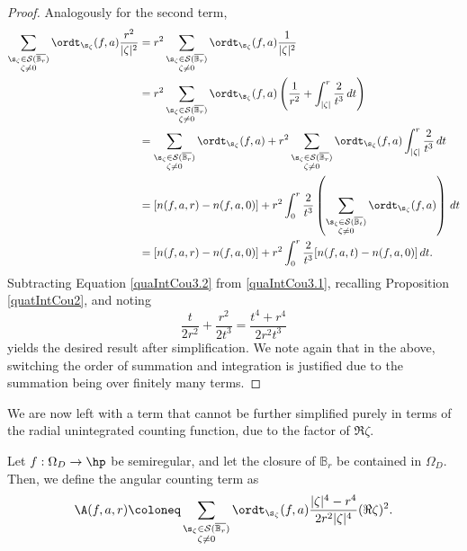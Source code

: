 \documentclass{amsart}
\begin{document}
\begin{proof}
    Analogously for the second term, \begin{align}\label{quaIntCou3.2}
        \sum_{\substack{ \s_\zeta\in\mathcal{S}(\overline{\mathbb B_r}) \\ \zeta\neq 0}}\ordt_{\s_\zeta}(f,a)\frac{r^2}{|\zeta|^2} 
        &= r^2 \sum_{\substack{ \s_\zeta\in\mathcal{S}(\overline{\mathbb B_r}) \\ \zeta\neq 0}}\ordt_{\s_\zeta}(f,a) \frac{1}{|\zeta|^2} \nonumber\\
        &= r^2 \sum_{\substack{ \s_\zeta\in\mathcal{S}(\overline{\mathbb B_r}) \\ \zeta\neq 0}}\ordt_{\s_\zeta}(f,a)\left(\frac{1}{r^2}+\int_{|\zeta|}^r\frac{2}{t^3}\,dt \right) \nonumber\\
        &= \sum_{\substack{ \s_\zeta\in\mathcal{S}(\overline{\mathbb B_r}) \\ \zeta\neq 0}}\ordt_{\s_\zeta}(f,a)+ r^2\sum_{\substack{ \s_\zeta\in\mathcal{S}(\overline{\mathbb B_r}) \\ \zeta\neq 0}}\ordt_{\s_\zeta}(f,a)\int_{|\zeta|}^r\frac{2}{t^3}\,dt \nonumber\\
        &= [n(f,a,r)-n(f,a,0)]+r^2\int_0^r \frac{2}{t^3}\left(\sum_{\substack{ \s_\zeta\in\mathcal{S}(\overline{\mathbb B_t}) \\ \zeta\neq 0}}\ordt_{\s_\zeta}(f,a)\right) \,dt \nonumber\\
        &= [n(f,a,r)-n(f,a,0)]+r^2\int_0^r \frac{2}{t^3}[n(f,a,t)-n(f,a,0)] \,dt.
    \end{align}
    Subtracting Equation \ref{quaIntCou3.2} from \ref{quaIntCou3.1}, recalling Proposition \ref{quatIntCou2}, and noting \[\frac{t}{2r^2}+\frac{r^2}{2t^3}=\frac{t^4+r^4}{2r^2t^3}\] yields the desired result after simplification. We note again that in the above, switching the order of summation and integration is justified due to the summation being over finitely many terms. 
\end{proof}

We are now left with a term that cannot be further simplified purely in terms of the radial unintegrated counting function, due to the factor of $\Re\zeta $. 
\begin{defin}\label{AngularCountingTerm}
     Let $f:\Omega_D\to\hp$ be semiregular, and let the closure of $\mathbb{B}_r$ be contained in $\Omega_D$. Then, we define the angular counting term as \[ \A(f,a,r)\coloneq \sum_{\substack{ \s_\zeta\in\mathcal{S}(\overline{\mathbb B_r}) \\ \zeta\neq 0}}
        \ordt_{\s_\zeta}(f,a) \frac{|\zeta|^4-r^4}{2r^2|\zeta|^4}(\Re \zeta)^2.\]
\end{defin}
\end{document}
